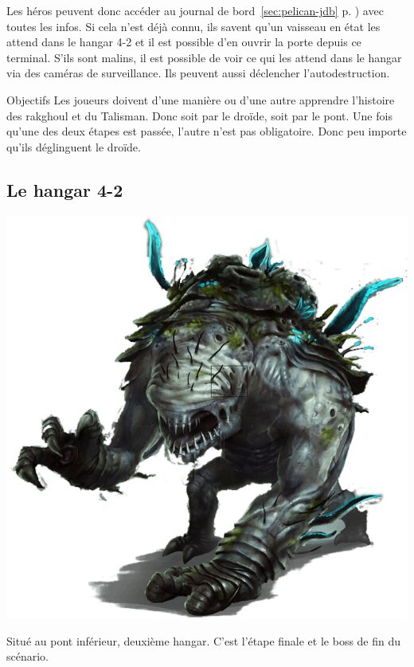 Les héros peuvent donc accéder au journal de bord~\ref{sec:pelican-jdb} p. \pageref{sec:pelican-jdb}) avec toutes les infos. Si cela n’est déjà connu, ils savent qu’un vaisseau en état les attend dans le hangar 4-2 et il est possible d’en ouvrir la porte depuis ce terminal. S’ils sont malins, il est possible de voir ce qui les attend dans le hangar via des caméras de surveillance. Ils peuvent aussi déclencher l’autodestruction.

\begin{paperbox}{Objectifs}
Les joueurs doivent d’une manière ou d’une autre apprendre l’histoire des rakghoul et du Talisman. Donc soit par le droïde, soit par le pont. Une fois qu’une des deux étapes est passée, l’autre n’est pas obligatoire. Donc peu importe qu’ils déglinguent le droïde.
\end{paperbox}

\subsection{Le hangar 4-2}

\noindent\includegraphics[width=\linewidth]{_img/dos-au-muur/rakghoul-amblyope.png}

Situé au pont inférieur, deuxième hangar. C’est l’étape finale et le boss de fin du scénario.

